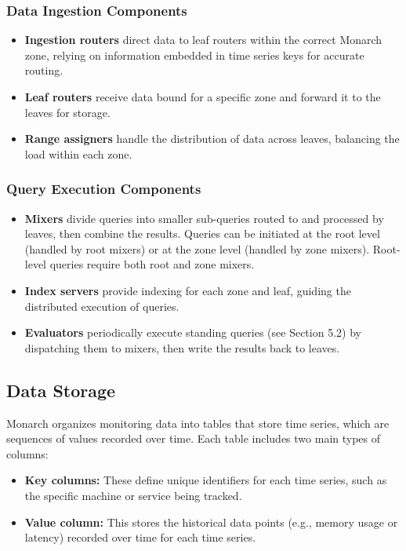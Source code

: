 \subsubsection*{Data Ingestion Components}

\begin{itemize}
    \item \textbf{Ingestion routers} direct data to leaf routers within the correct Monarch zone, relying on information embedded in time series keys for accurate routing.
    \item \textbf{Leaf routers} receive data bound for a specific zone and forward it to the leaves for storage.
    \item \textbf{Range assigners} handle the distribution of data across leaves, balancing the load within each zone.
\end{itemize}

\subsubsection*{Query Execution Components}

\begin{itemize}
    \item \textbf{Mixers} divide queries into smaller sub-queries routed to and processed by leaves, then combine the results. Queries can be initiated at the root level (handled by root mixers) or at the zone level (handled by zone mixers). Root-level queries require both root and zone mixers.
    \item \textbf{Index servers} provide indexing for each zone and leaf, guiding the distributed execution of queries.
    \item \textbf{Evaluators} periodically execute standing queries (see Section 5.2) by dispatching them to mixers, then write the results back to leaves.
\end{itemize}

\subsection{Data Storage}

Monarch organizes monitoring data into tables that store time series, which are sequences of values recorded over time. Each table includes two main types of columns:

\begin{itemize}
    \item \textbf{Key columns:} These define unique identifiers for each time series, such as the specific machine or service being tracked.
    \item \textbf{Value column:} This stores the historical data points (e.g., memory usage or latency) recorded over time for each time series.
\end{itemize}

